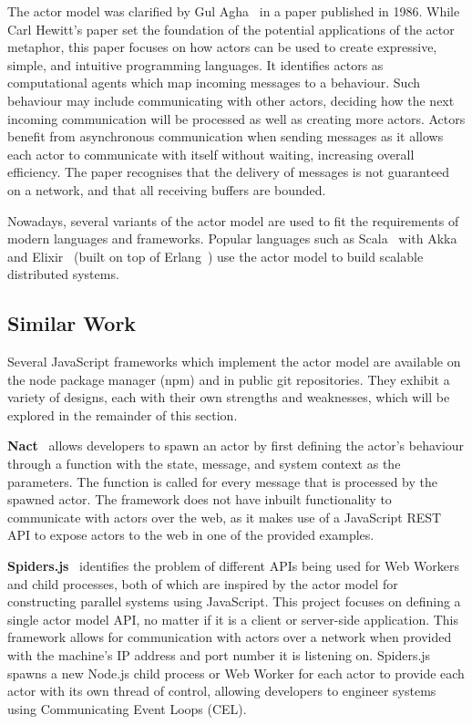 \documentclass[lettersize,journal]{IEEEtran}
\begin{document}
The actor model was clarified by Gul Agha~\cite{agha1985actors} in a paper published in 1986. While Carl Hewitt's paper set the foundation of the potential applications of the actor metaphor, this paper focuses on how actors can be used to create expressive, simple, and intuitive programming languages. It identifies actors as computational agents which map incoming messages to a behaviour. Such behaviour may include communicating with other actors, deciding how the next incoming communication will be processed as well as creating more actors. Actors benefit from asynchronous communication when sending messages as it allows each actor to communicate with itself without waiting, increasing overall efficiency. The paper recognises that the delivery of messages is not guaranteed on a network, and that all receiving buffers are bounded.

Nowadays, several variants of the actor model are used to fit the requirements of modern languages and frameworks. Popular languages such as Scala~\cite{scala} with Akka~\cite{akka} and Elixir~\cite{elixir} (built on top of Erlang~\cite{erlang}) use the actor model to build scalable distributed systems.

\subsection{Similar Work}
Several JavaScript frameworks which implement the actor model are available on the node package manager (npm) and in public git repositories. They exhibit a variety of designs, each with their own strengths and weaknesses, which will be explored in the remainder of this section.

\textbf{Nact}~\cite{nact} allows developers to spawn an actor by first defining the actor's behaviour through a function with the state, message, and system context as the parameters. The function is called for every message that is processed by the spawned actor. The framework does not have inbuilt functionality to communicate with actors over the web, as it makes use of a JavaScript REST API to expose actors to the web in one of the provided examples.

\textbf{Spiders.js}~\cite{spidersjs} identifies the problem of different APIs being used for Web Workers and child processes, both of which are inspired by the actor model for constructing parallel systems using JavaScript. This project focuses on defining a single actor model API, no matter if it is a client or server-side application. This framework allows for communication with actors over a network when provided with the machine's IP address and port number it is listening on. Spiders.js spawns a new Node.js child process or Web Worker for each actor to provide each actor with its own thread of control, allowing developers to engineer systems using Communicating Event Loops (CEL).
\end{document}
